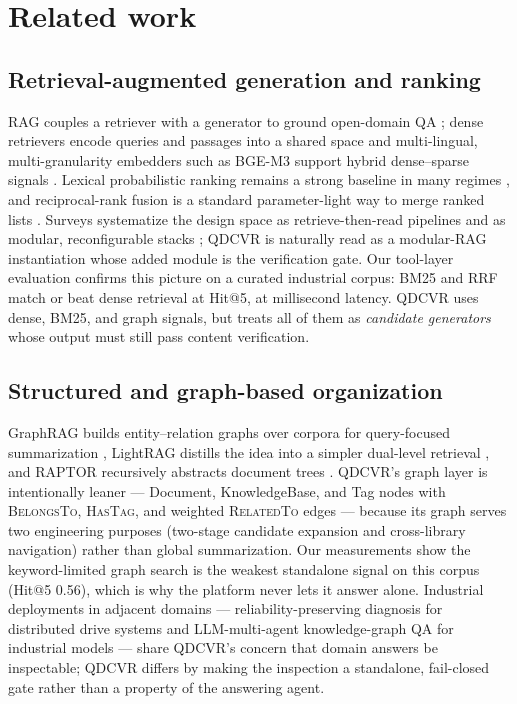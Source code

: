 \documentclass[preprint,12pt]{elsarticle}
\begin{document}
\section{Related work}
\label{sec:related}

\subsection{Retrieval-augmented generation and ranking}
RAG couples a retriever with a generator to ground open-domain QA
\cite{rag-lewis}; dense retrievers encode queries and passages into a shared
space \cite{dpr} and multi-lingual, multi-granularity embedders such as
BGE-M3 support hybrid dense--sparse signals \cite{bge-m3}. Lexical
probabilistic ranking remains a strong baseline in many regimes \cite{bm25},
and reciprocal-rank fusion is a standard parameter-light way to merge ranked
lists \cite{rrf-cormack}. Surveys systematize the design space as
retrieve-then-read pipelines \cite{gao-ragsurvey} and as modular,
reconfigurable stacks \cite{modular-rag}; QDCVR is naturally read as a
modular-RAG instantiation whose added module is the verification gate.
Our tool-layer evaluation confirms this picture on
a curated industrial corpus: BM25 and RRF match or beat dense retrieval at
Hit@5, at millisecond latency. QDCVR uses dense, BM25, and graph signals, but
treats all of them as \emph{candidate generators} whose output must still
pass content verification.

\subsection{Structured and graph-based organization}
GraphRAG builds entity--relation graphs over corpora for query-focused
summarization \cite{graphrag}, LightRAG distills the idea into a simpler
dual-level retrieval \cite{lightrag}, and RAPTOR recursively abstracts
document trees \cite{raptor}. QDCVR's graph layer is intentionally leaner ---
Document, KnowledgeBase, and Tag nodes with \textsc{BelongsTo},
\textsc{HasTag}, and weighted \textsc{RelatedTo} edges --- because its graph
serves two engineering purposes (two-stage candidate expansion and
cross-library navigation) rather than global summarization. Our measurements
show the keyword-limited graph search is the weakest standalone signal on
this corpus (Hit@5 0.56), which is why the platform never lets it answer
alone. Industrial deployments in adjacent domains --- reliability-preserving
diagnosis for distributed drive systems \cite{rrpdg} and LLM-multi-agent
knowledge-graph QA for industrial models \cite{comaikg} --- share QDCVR's
concern that domain answers be inspectable; QDCVR differs by making the
inspection a standalone, fail-closed gate rather than a property of the
answering agent.
\end{document}
